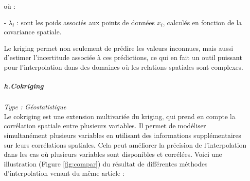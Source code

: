 où :


- \( \lambda_i \) : sont les poids associés aux points de données \( x_i \), calculés en fonction de la covariance spatiale.



Le kriging permet non seulement de prédire les valeurs inconnues, mais aussi d'estimer l'incertitude associée à ces prédictions, ce qui en fait un outil puissant pour l'interpolation dans des domaines où les relations spatiales sont complexes.




\subparagraph{h.Cokriging \cite{kringing}}
\textit{Type : Géostatistique} \\
\phantom{----}Le cokriging est une extension multivariée du kriging, qui prend en compte la corrélation spatiale entre plusieurs variables. Il permet de modéliser simultanément plusieurs variables en utilisant des informations supplémentaires sur leurs corrélations spatiales. Cela peut améliorer la précision de l'interpolation dans les cas où plusieurs variables sont disponibles et corrélées.
Voici une illustration (Figure \ref{fig:compar}) du résultat de différentes méthodes d'interpolation venant du même article :
